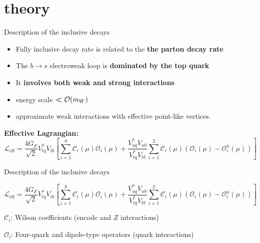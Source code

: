 \documentclass[xcolor=dvipsnames]{beamer}
\begin{document}
\section{\safeBtoXsdgamma theory}

\begin{frame}{Description of the inclusive decays}
   \scriptsize

   \begin{itemize}
      \item Fully inclusive decay rate is related to the \textbf{the parton decay rate}
      \item The $b\to s$ electroweak loop is \textbf{dominated by the top quark} 
      \item It \textbf{involves both weak and strong interactions}
      \item[\ra] energy scale $\ll{\ensuremath{\cal O}}(m_W)$
      \item[\ra] approximate weak interactions with effective point-like vertices.
   \end{itemize}

   \textbf{Effective Lagrangian:}
   \begin{equation}\nonumber
      \mathcal{L}_{\mathrm{eff}} = \frac{4G_F}{\sqrt{2}}V_{tq}^*V_{tb}\left[\sum^{8}_{i=1}\mathcal{C}_i(\mu)\mathcal{O}_i(\mu)
                                                  + \frac{V^*_{uq}V_{ub}}{V^*_{tq}V_{tb}}\sum^{2}_{i=1}\mathcal{C}_i(\mu)(\mathcal{O}_i(\mu)-\mathcal{O}_i^u(\mu))\right]
  \end{equation}

\end{frame}


\begin{frame}{Description of the inclusive decays}
   \scriptsize

   \begin{equation}\nonumber
      \mathcal{L}_{\mathrm{eff}} = \frac{4G_F}{\sqrt{2}}V_{tq}^*V_{tb}\left[\sum^{8}_{i=1}\mathcal{C}_i(\mu)\mathcal{O}_i(\mu)
                                                  + \frac{V^*_{uq}V_{ub}}{V^*_{tq}V_{tb}}\sum^{2}_{i=1}\mathcal{C}_i(\mu)(\mathcal{O}_i(\mu)-\mathcal{O}_i^u(\mu))\right]
  \end{equation}

  $\mathcal{C}_i$: Wilson coefficients (encode \Wpm and $Z$ interactions)
  
  $\mathcal{O}_i$: Four-quark and dipole-type operators (quark interactions)

\end{frame}
\end{document}

